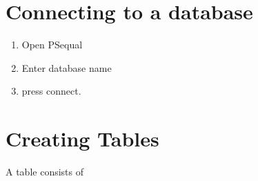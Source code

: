 \documentclass[]{article}
\begin{document}
\section{Connecting to a database}
\begin{enumerate}
	\item Open PSequal 
	\item  Enter database name
	\item press connect.
\end{enumerate}

\section{Creating Tables}
A table consists of 
\end{document}
